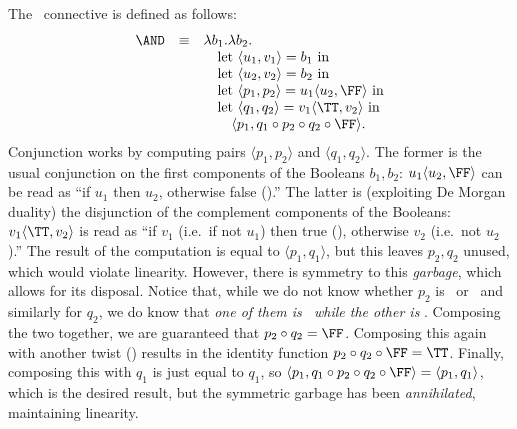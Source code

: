 The \AND\ connective is defined as follows:
\begin{displaymath}
\begin{array}{rcl}
\AND & \equiv & \lambda b_1.\lambda b_2.\\
\ & \ & \quad\mbox{let }\langle u_1,v_1\rangle = b_1\mbox{ in}\\
\ & \ & \quad\mbox{let }\langle u_2,v_2\rangle = b_2\mbox{ in}\\
\ & \ & \quad\mbox{let }\langle p_1,p_2\rangle = u_1\langle u_2, \FF\rangle \mbox{ in}\\
\ & \ & \quad\mbox{let }\langle q_1,q_2\rangle = v_1\langle \TT, v_2\rangle \mbox{ in}\\
\ & \ & \qquad\langle p_1, q_1 \circ p_2 \circ q_2 \circ \FF \rangle.
\end{array}
\end{displaymath}
Conjunction works by computing pairs $\langle p_1,p_2\rangle$ and
$\langle q_1,q_2\rangle$.  The former is the usual conjunction on the
first components of the Booleans $b_1,b_2$: $u_1\langle u_2,
\FF\rangle$ can be read as ``if $u_1$ then $u_2$, otherwise false
(\FF).''  The latter is (exploiting De Morgan duality) the disjunction
of the complement components of the Booleans:
$v_1\langle\TT,v_2\rangle$ is read as ``if $v_1$ (i.e.~if not $u_1$)
then true (\TT), otherwise $v_2$ (i.e.~not $u_2$).''  The result of
the computation is equal to $\langle p_1,q_1\rangle$, but this leaves
$p_2,q_2$ unused, which would violate linearity.  However, there is
symmetry to this {\em garbage}, which allows for its disposal.  Notice
that, while we do not know whether $p_2$ is \TT\ or \FF\ and similarly
for $q_2$, we do know that {\em one of them is \TT\ while the other is
  \FF}.  Composing the two together, we are guaranteed that $p_2 \circ
q_2 = \FF$.  Composing this again with another twist (\FF) results in
the identity function $p_2 \circ q_2 \circ \FF = \TT$.  Finally,
composing this with $q_1$ is just equal to $q_1$, so $\langle p_1, q_1
\circ p_2 \circ q_2 \circ \FF \rangle = \langle p_1, q_1\rangle$,
which is the desired result, but the symmetric garbage has been {\em
  annihilated}, maintaining linearity.

